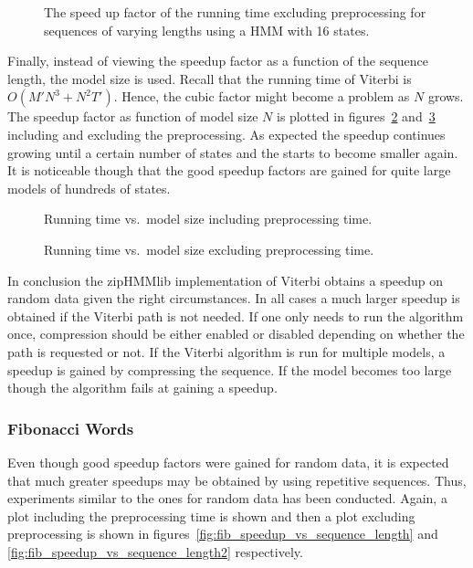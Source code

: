 \begin{figure}
  \centering
  
  \caption{The speed up factor of the running time excluding preprocessing for
    sequences of varying lengths using a HMM with 16 states.}
  \label{fig:speedup_vs_sequence_length2}
\end{figure}

Finally, instead of viewing the speedup factor as a function of the sequence
length, the model size is used. Recall that the running time of Viterbi is
$O(M' N^3 + N^2 T')$. Hence, the cubic factor might become a problem as $N$
grows. The speedup factor as function of model size $N$ is plotted in
figures~\ref{fig:speedup_vs_k} and~\ref{fig:speedup_vs_k2} including and
excluding the preprocessing. As expected the speedup continues growing until a
certain number of states and the starts to become smaller again. It is
noticeable though that the good speedup factors are gained for quite large
models of hundreds of states.

\begin{figure}
  \centering
  
  \caption{Running time vs.\ model size including preprocessing time.}
  \label{fig:speedup_vs_k}
\end{figure}

\begin{figure}
  \centering
  
  \caption{Running time vs.\ model size excluding preprocessing time.}
  \label{fig:speedup_vs_k2}
\end{figure}

In conclusion the zipHMMlib implementation of Viterbi obtains a speedup on
random data given the right circumstances. In all cases a much larger speedup
is obtained if the Viterbi path is not needed. If one only needs to run the
algorithm once, compression should be either enabled or disabled depending on
whether the path is requested or not. If the Viterbi algorithm is run for
multiple models, a speedup is gained by compressing the sequence. If the model
becomes too large though the algorithm fails at gaining a speedup.

\subsubsection{Fibonacci Words}

Even though good speedup factors were gained for random data, it is expected
that much greater speedups may be obtained by using repetitive
sequences. Thus, experiments similar to the ones for random data has been
conducted. Again, a plot including the preprocessing time is shown and then a
plot excluding preprocessing is shown in
figures~\ref{fig:fib_speedup_vs_sequence_length} and
\ref{fig:fib_speedup_vs_sequence_length2} respectively.

